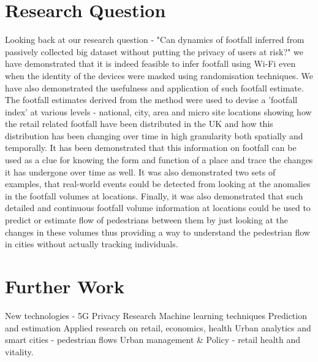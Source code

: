 \section{Research Question}
Looking back at our research question - "Can dynamics of footfall inferred from passively collected big dataset without putting the privacy of users at risk?"
we have demonstrated that it is indeed feasible to infer footfall using Wi-Fi even when the identity of the devices were masked using randomisation techniques.
We have also demonstrated the usefulness and application of such footfall estimate.
The footfall estimates derived from the method were used to devise a 'footfall index' at various levels - national, city, area and micro site locations showing how the retail related footfall have been distributed in the UK and how this distribution has been changing over time in high granularity both spatially and temporally.
It has been demonstrated that this information on footfall can be used as a clue for knowing the form and function of a place and trace the changes it has undergone over time as well.
It was also demonstrated two sets of examples, that real-world events could be detected from looking at the anomalies in the footfall volumes at locations.
Finally, it was also demonstrated that such detailed and continuous footfall volume information at locations could be used to predict or estimate flow of pedestrians between them by just looking at the changes in these volumes thus providing a way to understand the pedestrian flow in cities without actually tracking individuals.

\section{Further Work}

New technologies - 5G
Privacy Research
Machine learning techniques
Prediction and estimation
Applied research on retail, economics, health
Urban analytics and smart cities - pedestrian flows
Urban management \& Policy - retail health and vitality.


